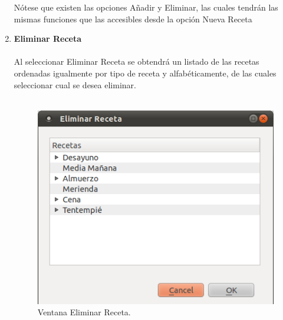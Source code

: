 \begin{enumerate}
Nótese que existen las opciones Añadir y Eliminar, las cuales tendrán las mismas funciones que las accesibles desde la opción Nueva Receta
\item \textbf{Eliminar Receta}\\\\
Al seleccionar Eliminar Receta se obtendrá un listado de las recetas ordenadas igualmente por tipo de receta y alfabéticamente, de las cuales seleccionar cual se desea eliminar.\\\\
\begin{figure}[H]
  \label{eliminar_receta}
  \begin{center}
    \includegraphics[scale=0.5]{../../Image/receta-eliminar.png}
  \end{center}
  \caption{Ventana Eliminar Receta.}
\end{figure}

\end{enumerate}


